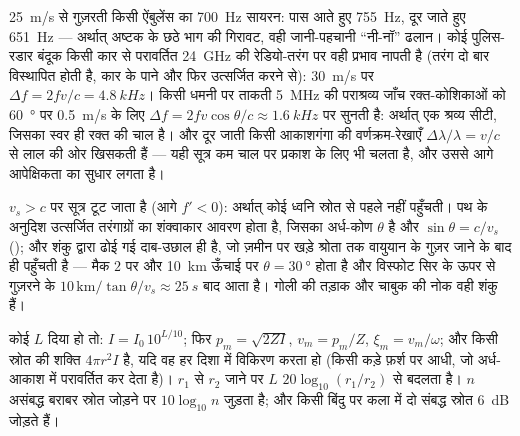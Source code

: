 \begin{example}[सायरन, रडार बंदूक, लाल कोशिकाएँ]\label{ex:b2:sound-waves:dopplerex}
\qty{25}{m/s} से गुज़रती किसी ऐंबुलेंस का \qty{700}{Hz} सायरन: पास आते हुए \qty{755}{Hz},
दूर जाते हुए \qty{651}{Hz} --- अर्थात् अष्टक के छठे भाग की गिरावट,
वही जानी-पहचानी ``नी-नॉ'' ढलान। कोई पुलिस-रडार बंदूक किसी कार से परावर्तित
\qty{24}{GHz} की रेडियो-तरंग पर वही प्रभाव नापती है (तरंग दो बार
विस्थापित होती है, कार के पाने और फिर उत्सर्जित करने से): \qty{30}{m/s} पर $\Delta f = 2fv/c =
\qty{4.8}{kHz}$। किसी धमनी पर ताकती \qty{5}{MHz} की पराश्रव्य जाँच
रक्त-कोशिकाओं को \qty{60}{\degree} पर \qty{0.5}{m/s} के लिए $\Delta f = 2fv\cos\theta/c \approx \qty{1.6}{kHz}$
पर सुनती है: अर्थात् एक श्रव्य सीटी, जिसका स्वर ही
रक्त की चाल है। और दूर जाती किसी आकाशगंगा की वर्णक्रम-रेखाएँ
$\Delta\lambda/\lambda = v/c$ से लाल की ओर खिसकती हैं --- यही सूत्र कम चाल पर प्रकाश के लिए भी चलता है,
और उससे आगे आपेक्षिकता का सुधार लगता है।
\end{example}

\begin{remark}[पराध्वनिक]\label{rem:b2:sound-waves:mach}
$v_s > c$ पर सूत्र टूट जाता है (आगे $f' < 0$): अर्थात् कोई ध्वनि स्रोत से
पहले नहीं पहुँचती। पथ के अनुदिश उत्सर्जित तरंगाग्रों का शंक्वाकार
आवरण होता है, जिसका अर्ध-कोण $\theta$ है और $\sin\theta = c/v_s$ (\emph{});
और शंकु द्वारा ढोई गई दाब-उछाल ही  है, जो ज़मीन पर खड़े
श्रोता तक वायुयान के गुज़र जाने के बाद ही पहुँचती है --- मैक $2$ पर और
\qty{10}{km} ऊँचाई पर $\theta = \qty{30}{\degree}$ होता है और विस्फोट सिर के
ऊपर से गुज़रने के $10\,\text{km}/\tan\theta/v_s \approx \qty{25}{s}$ बाद
आता है। गोली की तड़ाक और चाबुक की नोक वही शंकु हैं।
\end{remark}

\begin{method}[ध्वानिकी में परिमाण की कोटियाँ]\label{met:b2:sound-waves:method}
कोई  $L$ दिया हो तो: $I = I_0\,10^{L/10}$; फिर $p_m = \sqrt{2ZI}$,
$v_m = p_m/Z$, $\xi_m = v_m/\omega$; और किसी स्रोत की शक्ति $4\pi r^2I$ है, यदि वह
हर दिशा में विकिरण करता हो (किसी कड़े फ़र्श पर आधी, जो
अर्ध-आकाश में परावर्तित कर देता है)। $r_1$ से $r_2$ जाने पर $L$
$20\log_{10}(r_1/r_2)$ से बदलता है। $n$ असंबद्ध बराबर स्रोत जोड़ने पर
$10\log_{10}n$ जुड़ता है; और किसी बिंदु पर कला में दो संबद्ध स्रोत \qty{6}{dB} जोड़ते हैं।
\end{method}

